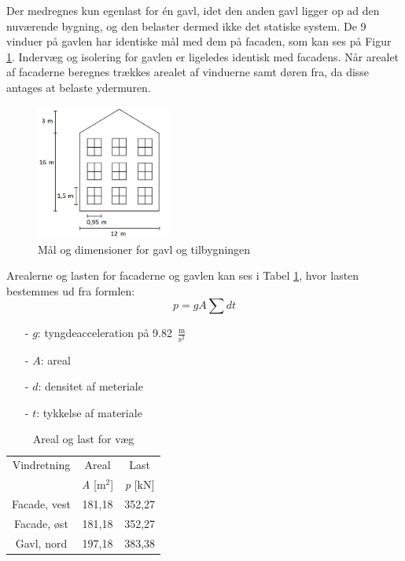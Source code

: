 Der medregnes kun egenlast for én gavl, idet den anden gavl ligger op ad den nuværende bygning, og den belaster dermed ikke det statiske system. 
\newline \indent{     }  De 9 vinduer på gavlen har identiske mål med dem på facaden, som kan ses på Figur \ref{fig:gavl}. Indervæg og isolering for gavlen er ligeledes identisk med facadens.
\newline \indent{     }  Når arealet af facaderne beregnes trækkes arealet af vinduerne samt døren fra, da disse antages at belaste ydermuren.

\begin{figure}[H]
	\centering
	\includegraphics[width=0.4\textwidth]{billeder/facadevestellerost.png}
	\caption{Mål og dimensioner for gavl og tilbygningen}
	\label{fig:gavl}
\end{figure}

Arealerne og lasten for facaderne og gavlen kan ses i Tabel \ref{tab:arealoglast}, hvor lasten bestemmes ud fra formlen:
\begin{equation}
	p = g A \sum dt
\end{equation}

\begin{itemize}
	\item[-] $g$: tyngdeacceleration på \SI{9,82}{$\frac{\text{m}}{\text{s}^2}$}
	\item[-] $A$: areal
	\item[-] $d$: densitet af meteriale
	\item[-] $t$: tykkelse af materiale
\end{itemize}

\begin{table}
	\begin{center}
		\begin{tabular}{c c c }
			\hline
			Vindretning & Areal   & Last    \\
			& \textit{A} [$\text{m}^2$] & \textit{p} [kN] \\ \hline
			Facade, vest & 181,18 & 352,27 \\
			Facade, øst  & 181,18 & 352,27 \\
			Gavl, nord   & 197,18 & 383,38 \\
		\end{tabular}
		\caption{Areal og last for væg}
		\label{tab:arealoglast}
	\end{center}
\end{table}

